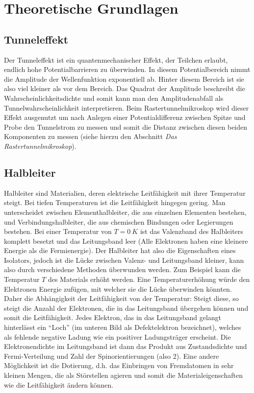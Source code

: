 \section{Theoretische Grundlagen}

\subsection{Tunneleffekt}

Der Tunneleffekt ist ein quantenmechanischer Effekt, der Teilchen erlaubt, endlich hohe Potentialbarrieren zu überwinden. In diesem Potentialbereich nimmt die Amplitude der Wellenfunktion exponentiell ab. Hinter diesem Bereich ist sie also viel kleiner als vor dem Bereich. Das Quadrat der Amplitude beschreibt die Wahrscheinlichkeitsdichte und somit kann man den Amplitudenabfall als Tunnelwahrscheinlichkeit interpretieren.
Beim Rastertunnelmikroskop wird dieser Effekt ausgenutzt um nach Anlegen einer Potentialdifferenz zwischen Spitze und Probe den Tunnelstrom zu messen und somit die Distanz zwischen diesen beiden Komponenten zu messen (siehe hierzu den Abschnitt \emph{Das Rastertunnelmikroskop}).

\subsection{Halbleiter}


Halbleiter sind Materialien, deren elektrische Leitfähigkeit mit ihrer Temperatur steigt. Bei tiefen Temperaturen ist die Leitfähigkeit hingegen gering. Man unterscheidet zwischen Elementhalbleiter, die aus einzelnen Elementen bestehen, und Verbindungshalbleiter, die aus chemischen Bindungen oder Legierungen bestehen. Bei einer Temperatur von $T=0 \ K$ ist das Valenzband des Halbleiters komplett besetzt und das Leitungsband leer (Alle Elektronen haben eine kleinere Energie als die Fermienergie). Der Halbleiter hat also die Eigenschaften eines Isolators, jedoch ist die Lücke zwischen Valenz- und Leitungsband kleiner, kann also durch verschiedene Methoden überwunden werden. Zum Beispiel kann die Temperatur $T$ des Materials erhöht werden. Eine Temperaturerhöhung würde den Elektronen Energie zufügen, mit welcher sie die Lücke überwinden könnten. Daher die Abhängigkeit der Leitfähigkeit von der Temperatur: Steigt diese, so steigt die Anzahl der Elektronen, die in das Leitungsband übergehen können und somit die Leitfähigkeit. Jedes Elektron, das in das Leitungsband gelangt hinterlässt ein "`Loch"' (im unteren Bild als Defektelektron bezeichnet), welches als fehlende negative Ladung wie ein positiver Ladungsträger erscheint. Die Elektronendichte im Leitungsband ist dann das Produkt aus Zustandsdichte und Fermi-Verteilung und Zahl der Spinorientierungen (also 2). Eine andere Möglichkeit ist die Dotierung, d.h. das Einbringen von Fremdatomen in sehr kleinen Mengen, die als Störstellen agieren und somit die Materialeigenschaften wie die Leitfähigkeit ändern können.

